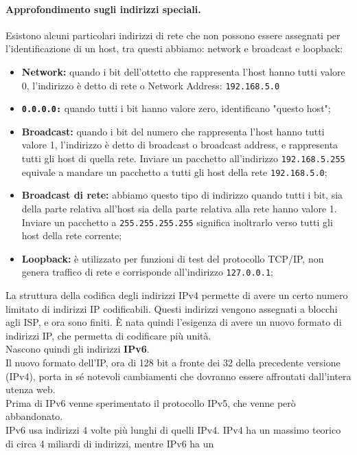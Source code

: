 \documentclass[a4paper]{report}
\begin{document}
\paragraph{Approfondimento sugli indirizzi speciali.} Esistono alcuni particolari indirizzi di rete che non possono essere assegnati per
l'identificazione di un host, tra questi abbiamo: network e broadcast e loopback:
\begin{itemize}
\item \textbf{Network:} quando i bit dell'ottetto che rappresenta l'host hanno tutti valore 0,
l'indirizzo è detto di rete o Network Address: \texttt{192.168.5.0}
\item \textbf{\texttt{0.0.0.0:}} quando tutti i bit hanno valore zero, identificano "questo host";
\item \textbf{Broadcast:} quando i bit del numero che rappresenta l'host hanno tutti valore 1,
l'indirizzo è detto di broadcast o broadcast address, e rappresenta tutti gli host di
quella rete. Inviare un pacchetto all'indirizzo \texttt{192.168.5.255} equivale a mandare un
pacchetto a tutti gli host della rete \texttt{192.168.5.0};
\item \textbf{Broadcast di rete:} abbiamo questo tipo di indirizzo quando tutti i bit, sia della parte
relativa all'host sia della parte relativa alla rete hanno valore 1. Inviare un pacchetto
a \texttt{255.255.255.255} significa inoltrarlo verso tutti gli host della rete corrente;
\item \textbf{Loopback:} è utilizzato per funzioni di test del protocollo TCP/IP, non genera traffico
di rete e corrisponde all'indirizzo \texttt{127.0.0.1};
\end{itemize}
La struttura della codifica degli indirizzi IPv4 permette di avere un certo numero limitato di indirizzi IP codificabili. Questi indirizzi vengono assegnati a blocchi agli ISP, e ora sono finiti. È nata quindi l'esigenza di avere un nuovo formato di indirizzi IP, che permetta di codificare più unità.\\
Nascono quindi gli indirizzi \textbf{IPv6}.\\
Il nuovo formato dell'IP, ora di 128 bit a fronte
dei 32 della precedente versione (IPv4), porta in
sé notevoli cambiamenti che dovranno essere
affrontati dall'intera utenza web.\\
Prima di IPv6 venne sperimentato il protocollo IPv5, che venne però abbandonato.\\
IPv6 usa indirizzi 4 volte più lunghi di quelli IPv4. IPv4 ha un
massimo teorico di circa 4 miliardi di indirizzi, mentre IPv6 ha un
\end{document}
